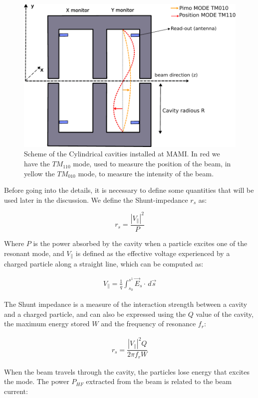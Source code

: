\begin{figure}[!hbtp]
\centering
\includegraphics[width = 0.65 \textwidth]{ExperimentalSetup/Monitors.pdf}
\caption{Scheme of the Cylindrical cavities installed at MAMI. In red we have the $TM_{110}$ mode, used to measure the position of the beam, in yellow the $TM_{010}$ mode, to measure the intensity of the beam.}
\label{fig:CylindricMonit}
\end{figure}


Before going into the details, it is necessary to define some quantities that will be used later in the discussion. We define the Shunt-impedance $r_{s}$ as:

\begin{equation}
r_{s} = \frac{|V_{\|}|^{2}}{P}
\end{equation}

Where $P$ is the power absorbed by the cavity when a particle excites one of the resonant mode, and $V_{\|}$ is defined as the effective voltage experienced by a charged particle along a straight line, which can be computed as:

\begin{align*}
V_{\|} = \frac{1}{q}  \int_{s_{0}}^{s^{1}} \vec{E}_{s} \cdot  \,d \vec{s}
\end{align*}

The Shunt impedance is a measure of the interaction strength between a cavity and a charged particle, and can also be expressed using the $Q$ value of the cavity, the maximum energy stored $W$ and the frequency of resonance $f_{r}$:

\begin{align*}
r_{s} = \dfrac{|V_{\|}|^{2} Q}{2 \pi f_{r} W}
\end{align*}

When the beam travels through the cavity, the particles lose energy that excites the mode. The power $P_{HF}$ extracted from the beam is related to the beam current: 


